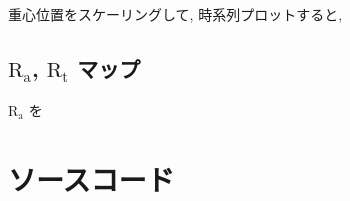 \documentclass[dvipdfmx]{jsarticle}
\numberwithin{equation}{subsection}
\begin{document}
重心位置をスケーリングして, 時系列プロットすると,



\subsection{$\text{R}_\text{a}$, $\text{R}_\text{t}$ マップ}

$\text{R}_\text{a}$ を



\appendix
\section{ソースコード}




\end{document}
